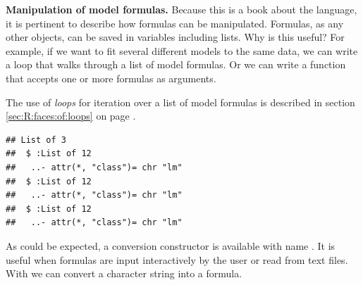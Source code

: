 \documentclass[krantz2]{krantz}\usepackage{knitr}
\begin{document}
\begin{explainbox}
\textbf{Manipulation of model formulas.} Because this is a book about the \Rlang language, it is pertinent to describe how formulas can be manipulated. Formulas, as any other \Rlang objects, can be saved in variables including lists. Why is this useful? For example, if we want to fit several different models to the same data, we can write a  loop that walks through a list of model formulas. Or we can write a function that accepts one or more formulas as arguments.

The use of  \emph{loops} for iteration over a list of model formulas is described in section \ref{sec:R:faces:of:loops} on page \pageref{sec:R:faces:of:loops}.

\begin{knitrout}\footnotesize
{}\color{fgcolor}\begin{kframe}
\begin{alltt}
 \hlkwb{<-} \hlstd{(} \hlstd{=} \hlopt{:}\hlstd{,}  \hlstd{= (}\hlopt{:}\hlstd{)} \hlopt{/}  \hlopt{+} \hlstd{(}\hlstd{))}
 \hlkwb{<-} \hlstd{()}
 \hlkwb{<-} \hlstd{(}  \hlopt{~}  \hlopt{-} \hlstd{,}   \hlopt{~}    \hlopt{~}  \hlopt{+} \hlopt{^}\hlstd{)}
   
  \hlkwb{<-}  \hlstd{(}  
 \hlstd{\}}
  \hlstd{=} \hlstd{)}
\end{alltt}
\begin{verbatim}
## List of 3
##  $ :List of 12
##   ..- attr(*, "class")= chr "lm"
##  $ :List of 12
##   ..- attr(*, "class")= chr "lm"
##  $ :List of 12
##   ..- attr(*, "class")= chr "lm"
\end{verbatim}
\end{kframe}
\end{knitrout}

As could be expected, a conversion constructor is available with name . It is useful when formulas are input interactively by the user or read from text files. With  we can convert a character string into a formula.


\end{explainbox}
\end{document}
